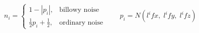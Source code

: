 \documentclass[border=6pt]{standalone}
\begin{document}
\color{black}
\(\displaystyle
n_i =
\begin{cases}
1-\left|p_i\right|, & \text{billowy noise}\\[3pt]
\frac{1}{2}p_i+\frac{1}{2}, & \text{ordinary noise}
\end{cases}
\qquad
p_i=N\!\left(l^i f x,\;l^i f y,\;l^i f z\right)
\)
\end{document}
